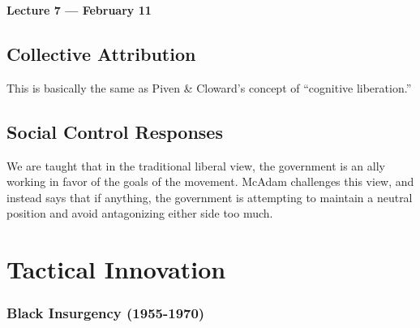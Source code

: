 \vspace{3mm}
\noindent \textbf{Lecture 7 --- February 11\th}

\subsection{Collective Attribution}
This is basically the same as Piven \& Cloward's concept of ``cognitive liberation.''

\subsection{Social Control Responses}
We are taught that in the traditional liberal view, the government is an ally working in favor of the goals of the movement.
McAdam challenges this view, and instead says that if anything, the government is attempting to maintain a neutral position and avoid antagonizing either side too much.


\section{Tactical Innovation}
\subsubsection{Black Insurgency (1955-1970)}

